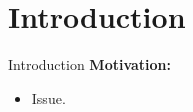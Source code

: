 \section{Introduction}

\begin{frame}{Introduction}
    \textbf{Motivation:}
    \begin{itemize}
      \item Issue.
    \end{itemize}
\end{frame}

